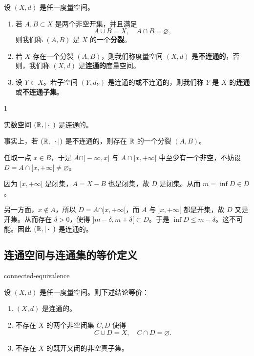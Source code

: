 \begin{mydef*}{}

设 $(X,d)$ 是任一度量空间。

\begin{enumerate}[label=\arabic{enumi})]
\item 若 $A,B\subset X$ 是两个非空开集，并且满足
\[A\cup B=X,\quad A\cap B=\varnothing,\]
则我们称 $(A,B)$ 是 $X$ 的一个\textbf{分裂}。
\item 若 $X$ 存在一个分裂 $(A,B)$，则我们称度量空间 $(X,d)$ 是\textbf{不连通的}，否则，我们称 $(X,d)$ 是\textbf{连通的}度量空间。
\item 设 $Y\subset X$。若子空间 $(Y,d_Y)$ 是连通的或不连通的，则我们称 $Y$ 是 $X$ 的\textbf{连通}或\textbf{不连通子集}。
\end{enumerate}

\end{mydef*}

\begin{sourceexample}{1}

实数空间 $(\mathbb{R},|\cdot|)$ 是连通的。

事实上，若 $(\mathbb{R},|\cdot|)$ 是不连通的，则存在 $\mathbb{R}$ 的一个分裂 $(A,B)$。

任取一点 $x\in B$，于是 $A\cap]-\infty,x]$ 与 $A\cap[x,+\infty[$ 中至少有一个非空，不妨设 $D=A\cap[x,+\infty[\neq\varnothing$。

因为 $[x,+\infty[$ 是闭集，$A=X-B$ 也是闭集，故 $D$ 是闭集。从而 $m=\inf D\in D$。

另一方面，$x\notin A$，所以 $D=A\cap]x,+\infty[$，而 $A$ 与 $]x,+\infty[$ 都是开集，故 $D$ 又是开集。从而存在 $\delta>0$，使得 $]m-\delta,m+\delta[\subset D$。于是 $\inf D\leqslant m-\delta$。这不可能。因此 $(\mathbb{R},|\cdot|)$ 是连通的。

\end{sourceexample}

\subsection{连通空间与连通集的等价定义}

\begin{mythm}{}{connected-equivalence}

设 $(X,d)$ 是任一度量空间。则下述结论等价：

\begin{enumerate}[label=\arabic{enumi})]
\item $(X,d)$ 是连通的。
\item 不存在 $X$ 的两个非空闭集 $C,D$ 使得
\[C\cup D=X,\quad C\cap D=\varnothing.\]
\item 不存在 $X$ 的既开又闭的非空真子集。
\end{enumerate}

\end{mythm}

